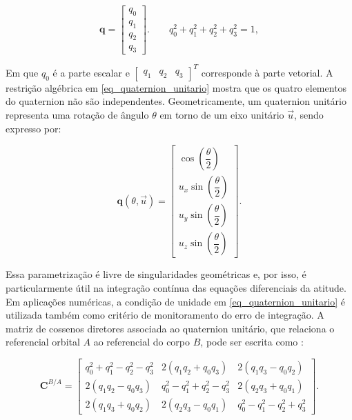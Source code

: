 \begin{equation}
\mathbf{q}=
\begin{bmatrix}
q_0 \\
q_1 \\
q_2 \\
q_3
\end{bmatrix}.
\qquad
q_0^2+q_1^2+q_2^2+q_3^2=1,
\label{eq_quaternion_unitario}
\end{equation}

Em que $q_0$ é a parte escalar e $\begin{bmatrix} q_1 & q_2 & q_3 \end{bmatrix}^{T}$ corresponde à parte vetorial. A restrição algébrica em \eqref{eq_quaternion_unitario} mostra que os quatro elementos do quaternion não são independentes.
Geometricamente, um quaternion unitário representa uma rotação de ângulo $\theta$ em torno de um eixo unitário $\vec{u}$, sendo expresso por:

\begin{equation}
\mathbf{q}(\theta,\vec{u})=
\begin{bmatrix}
\cos\left(\dfrac{\theta}{2}\right) \\
u_x\sin\left(\dfrac{\theta}{2}\right) \\
u_y\sin\left(\dfrac{\theta}{2}\right) \\
u_z\sin\left(\dfrac{\theta}{2}\right)
\end{bmatrix}.
\label{eq_quaternion_axis_angle}
\end{equation}

Essa parametrização é livre de singularidades geométricas e, por isso, é particularmente útil na integração contínua das equações diferenciais da atitude. Em aplicações numéricas, a condição de unidade em \eqref{eq_quaternion_unitario} é utilizada também como critério de monitoramento do erro de integração.
A matriz de cossenos diretores associada ao quaternion unitário, que relaciona o referencial orbital $A$ ao referencial do corpo $B$, pode ser escrita como \cite{wie2008space}:

\begin{equation}
\mathbf{C}^{B/A}=
\begin{bmatrix}
q_0^2+q_1^2-q_2^2-q_3^2 & 2(q_1q_2+q_0q_3) & 2(q_1q_3-q_0q_2) \\
2(q_1q_2-q_0q_3) & q_0^2-q_1^2+q_2^2-q_3^2 & 2(q_2q_3+q_0q_1) \\
2(q_1q_3+q_0q_2) & 2(q_2q_3-q_0q_1) & q_0^2-q_1^2-q_2^2+q_3^2
\end{bmatrix}.
\label{eq_dcm_quaternion}
\end{equation}

